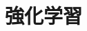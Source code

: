 \documentclass[../../../topic_machine-learning]{subfiles}
\begin{document}
\sectionline
\section{強化学習}

\end{document}
